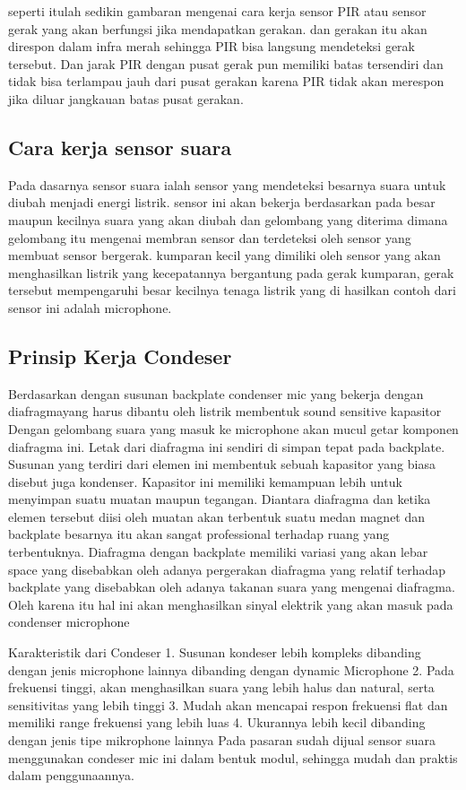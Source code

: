 seperti itulah sedikin gambaran mengenai cara kerja sensor PIR atau sensor gerak yang akan berfungsi jika mendapatkan gerakan. dan gerakan itu akan direspon dalam infra merah sehingga PIR bisa langsung mendeteksi gerak tersebut. Dan jarak PIR dengan pusat gerak pun memiliki batas tersendiri dan tidak bisa terlampau jauh dari pusat gerakan karena PIR tidak akan merespon jika diluar jangkauan batas pusat gerakan.

\subsection {Cara kerja sensor suara}

Pada dasarnya sensor suara ialah sensor yang mendeteksi besarnya suara untuk diubah menjadi energi listrik. sensor ini akan bekerja berdasarkan pada besar maupun kecilnya suara yang akan diubah dan gelombang yang diterima dimana gelombang itu mengenai membran sensor dan terdeteksi oleh sensor yang membuat sensor bergerak. kumparan kecil yang dimiliki oleh sensor yang akan menghasilkan listrik yang kecepatannya bergantung pada gerak kumparan, gerak tersebut mempengaruhi besar kecilnya tenaga listrik yang di hasilkan contoh dari sensor ini adalah microphone.

\subsection {Prinsip Kerja Condeser}
Berdasarkan dengan susunan backplate condenser mic yang bekerja dengan diafragmayang harus dibantu oleh listrik membentuk sound sensitive kapasitor  Dengan gelombang suara yang masuk ke microphone akan mucul getar komponen diafragma ini. Letak dari diafragma ini sendiri di simpan tepat pada backplate. Susunan yang terdiri dari elemen ini membentuk sebuah kapasitor yang biasa disebut juga kondenser. Kapasitor ini memiliki kemampuan lebih untuk menyimpan suatu muatan maupun tegangan. Diantara diafragma dan ketika elemen tersebut diisi oleh muatan akan terbentuk suatu medan magnet dan backplate besarnya itu akan sangat professional terhadap ruang yang terbentuknya. Diafragma dengan backplate memiliki variasi yang akan lebar space yang disebabkan oleh adanya pergerakan diafragma yang relatif terhadap backplate yang disebabkan oleh adanya takanan suara yang mengenai diafragma. Oleh karena itu hal ini akan menghasilkan sinyal elektrik yang akan masuk pada condenser microphone

Karakteristik dari Condeser
1. Susunan kondeser lebih kompleks dibanding dengan jenis microphone lainnya dibanding dengan dynamic Microphone
2. Pada frekuensi tinggi, akan menghasilkan suara yang lebih halus dan natural, serta sensitivitas yang lebih tinggi
3. Mudah akan mencapai respon frekuensi flat dan memiliki range frekuensi yang lebih luas
4. Ukurannya lebih kecil dibanding dengan jenis tipe mikrophone lainnya
Pada pasaran sudah dijual sensor suara menggunakan condeser mic ini dalam bentuk modul, sehingga mudah dan praktis dalam penggunaannya.

